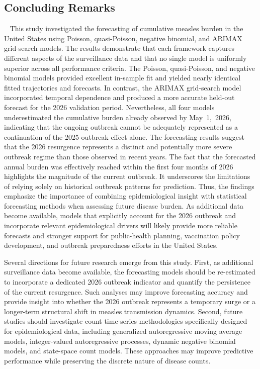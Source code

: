 \documentclass[utf8]{FrontiersinHarvard} %
\begin{document}
\subsection{Concluding Remarks}~\label{sec:conclusion} 
This study investigated the forecasting of cumulative measles burden in the United States using Poisson, quasi-Poisson, negative binomial, and ARIMAX grid-search models. The results demonstrate that each framework captures different aspects of the surveillance data and that no single model is uniformly superior across all performance criteria. The Poisson, quasi-Poisson, and negative binomial models provided excellent in-sample fit and yielded nearly identical fitted trajectories and forecasts. In contrast, the ARIMAX grid-search model incorporated temporal dependence and produced a more accurate held-out forecast for the 2026 validation period. Nevertheless, all four models underestimated the cumulative burden already observed by May~1,~2026, indicating that the ongoing outbreak cannot be adequately represented as a continuation of the 2025 outbreak effect alone. The forecasting results suggest that the 2026 resurgence represents a distinct and potentially more severe outbreak regime than those observed in recent years. The fact that the forecasted annual burden was effectively reached within the first four months of 2026 highlights the magnitude of the current outbreak. It underscores the limitations of relying solely on historical outbreak patterns for prediction. Thus, the findings emphasize the importance of combining epidemiological insight with statistical forecasting methods when assessing future disease burden. As additional data become available, models that explicitly account for the 2026 outbreak and incorporate relevant epidemiological drivers will likely provide more reliable forecasts and stronger support for public-health planning, vaccination policy development, and outbreak preparedness efforts in the United States.

Several directions for future research emerge from this study. First, as additional surveillance data become available, the forecasting models should be re-estimated to incorporate a dedicated 2026 outbreak indicator and quantify the persistence of the current resurgence. Such analyses may improve forecasting accuracy and provide insight into whether the 2026 outbreak represents a temporary surge or a longer-term structural shift in measles transmission dynamics. Second, future studies should investigate count time-series methodologies specifically designed for epidemiological data, including generalized autoregressive moving average models, integer-valued autoregressive processes, dynamic negative binomial models, and state-space count models. These approaches may improve predictive performance while preserving the discrete nature of disease counts.
\end{document}
